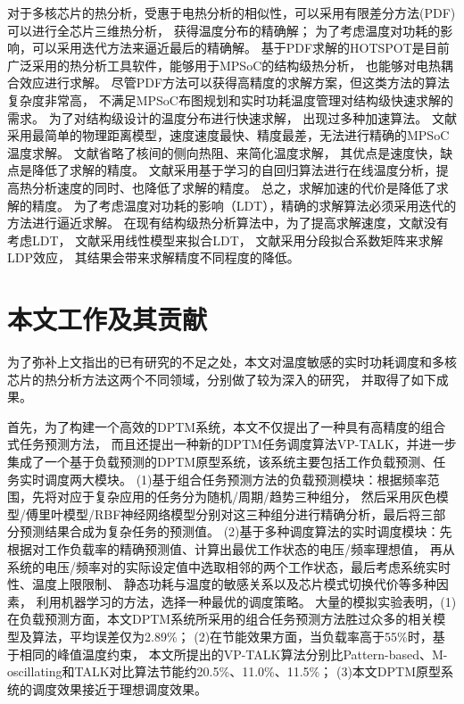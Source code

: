 对于多核芯片的热分析，受惠于电热分析的相似性，可以采用有限差分方法(PDF)可以进行全芯片三维热分析， 获得温度分布的精确解； 为了考虑温度对功耗的影响，可以采用迭代方法来逼近最后的精确解。 基于PDF求解的HOTSPOT是目前广泛采用的热分析工具软件，能够用于MPSoC的结构级热分析， 也能够对电热耦合效应进行求解。 尽管PDF方法可以获得高精度的求解方案，但这类方法的算法复杂度非常高， 不满足MPSoC布图规划和实时功耗温度管理对结构级快速求解的需求。
为了对结构级设计的温度分布进行快速求解， 出现过多种加速算法。 文献采用最简单的物理距离模型，速度速度最快、精度最差，无法进行精确的MPSoC温度求解。 文献省略了核间的侧向热阻、来简化温度求解， 其优点是速度快，缺点是降低了求解的精度。 文献采用基于学习的自回归算法进行在线温度分析，提高热分析速度的同时、也降低了求解的精度。 总之，求解加速的代价是降低了求解的精度。
为了考虑温度对功耗的影响（LDT），精确的求解算法必须采用迭代的方法进行逼近求解。 在现有结构级热分析算法中，为了提高求解速度，文献没有考虑LDT， 文献采用线性模型来拟合LDT， 文献采用分段拟合系数矩阵来求解LDP效应， 其结果会带来求解精度不同程度的降低。




\section{本文工作及其贡献}
为了弥补上文指出的已有研究的不足之处，本文对温度敏感的实时功耗调度和多核芯片的热分析方法这两个不同领域，分别做了较为深入的研究， 并取得了如下成果。

首先，为了构建一个高效的DPTM系统，本文不仅提出了一种具有高精度的组合式任务预测方法， 而且还提出一种新的DPTM任务调度算法VP-TALK，并进一步集成了一个基于负载预测的DPTM原型系统，该系统主要包括工作负载预测、任务实时调度两大模块。
(1)基于组合任务预测方法的负载预测模块：根据频率范围，先将对应于复杂应用的任务分为随机/周期/趋势三种组分， 然后采用灰色模型/傅里叶模型/RBF神经网络模型分别对这三种组分进行精确分析，最后将三部分预测结果合成为复杂任务的预测值。
(2)基于多种调度算法的实时调度模块：先根据对工作负载率的精确预测值、计算出最优工作状态的电压/频率理想值， 再从系统的电压/频率对的实际设定值中选取相邻的两个工作状态，最后考虑系统实时性、温度上限限制、 静态功耗与温度的敏感关系以及芯片模式切换代价等多种因素， 利用机器学习的方法，选择一种最优的调度策略。
大量的模拟实验表明，(1)在负载预测方面，本文DPTM系统所采用的组合任务预测方法胜过众多的相关模型及算法，平均误差仅为2.89\%； (2)在节能效果方面，当负载率高于55\%时，基于相同的峰值温度约束， 本文所提出的VP-TALK算法分别比Pattern-based、M-oscillating和TALK对比算法节能约20.5\%、11.0\%、11.5\%； (3)本文DPTM原型系统的调度效果接近于理想调度效果。


